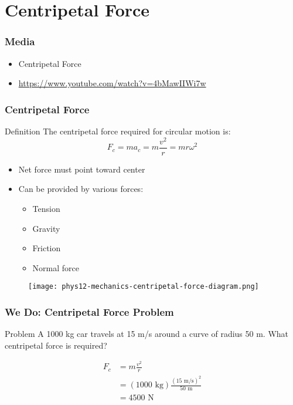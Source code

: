 \documentclass{beamer}
\begin{document}
\section{Centripetal Force}

\begin{frame}
\frametitle{Media}
     \begin{itemize}
  \item Centripetal Force
  \item \hyperlink{https://www.youtube.com/watch?v=4bMawIIWi7w}{https://www.youtube.com/watch?v=4bMawIIWi7w}
  \end{itemize}
\end{frame}
    

\begin{frame}
\frametitle{Centripetal Force}
\begin{block}{Definition}
The centripetal force required for circular motion is:
\[ F_c = ma_c = m\frac{v^2}{r} = mr\omega^2 \]
\end{block}
\begin{itemize}
\item Net force must point toward center
\item Can be provided by various forces:
  \begin{itemize}
  \item Tension
  \item Gravity
  \item Friction
  \item Normal force
  \end{itemize}
\end{itemize}
\end{frame}

\begin{frame}
\begin{figure}
    \centering
    \texttt{[image: phys12-mechanics-centripetal-force-diagram.png]}
\end{figure}
\end{frame}

\begin{frame}
\frametitle{We Do: Centripetal Force Problem}
\begin{block}{Problem}
A 1000 kg car travels at 15 m/s around a curve of radius 50 m.
What centripetal force is required?
\end{block}
\begin{align*}
F_c &= m\frac{v^2}{r} \\
&= (1000\text{ kg})\frac{(15\text{ m/s})^2}{50\text{ m}} \\
&= 4500\text{ N}
\end{align*}
\end{frame}
\end{document}
